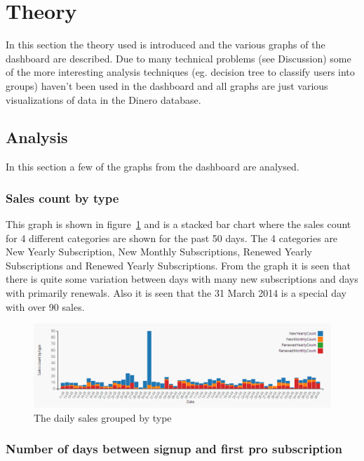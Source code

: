 \documentclass{acm_proc_article-sp}
\begin{document}


\section{Theory}

In this section the theory used is introduced and the various graphs of the dashboard are described. Due to many technical problems (see Discussion) some of the more interesting analysis techniques (eg. decision tree to classify users into groups) haven't been used in the dashboard and all graphs are just various visualizations of data in the Dinero database.

\subsection{Analysis}

In this section a few of the graphs from the dashboard are analysed.

\subsubsection{Sales count by type}

This graph is shown in figure~\ref{fig:daily-sales} and is a stacked bar chart where the sales count for 4 different categories are shown for the past 50 days. The 4 categories are New Yearly Subscription, New Monthly Subscriptions, Renewed Yearly Subscriptions and Renewed Yearly Subscriptions. From the graph it is seen that there is quite some variation between days with many new subscriptions and days with primarily renewals. Also it is seen that the 31 March 2014 is a special day with over 90 sales.

\begin{figure}
    \centering
    \includegraphics[width=\columnwidth]{sales-count-by-type.png}
    \caption{The daily sales grouped by type}
    \label{fig:daily-sales}
\end{figure}

\subsubsection{Number of days between signup and first pro subscription}
\end{document}
